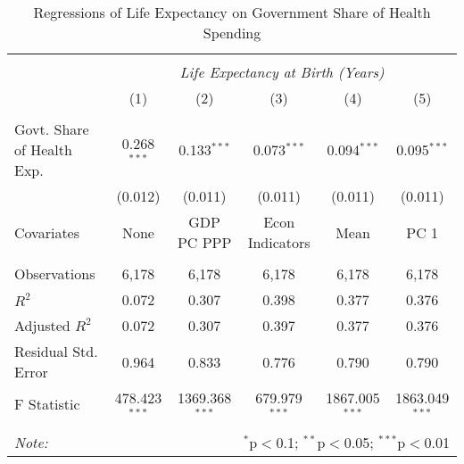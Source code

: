 \begin{table}[!htbp] \centering
  \caption{Regressions of Life Expectancy on Government Share of Health Spending \label{main_regs}}
\begin{tabular}{@{\extracolsep{5pt}}lccccc}
\\[-1.8ex]\hline
\hline \\[-1.8ex]
& \multicolumn{5}{c}{\textit{Life Expectancy at Birth (Years)}} \
\cr \
\\[-1.8ex] & (1) & (2) & (3) & (4) & (5) \\
\hline \\[-1.8ex]
 Govt. Share of Health Exp. & 0.268$^{***}$ & 0.133$^{***}$ & 0.073$^{***}$ & 0.094$^{***}$ & 0.095$^{***}$ \\
  & (0.012) & (0.011) & (0.011) & (0.011) & (0.011) \\
 Covariates & None & GDP PC PPP & Econ Indicators & Mean & PC 1 \\
\hline \\[-1.8ex]
 Observations & 6,178 & 6,178 & 6,178 & 6,178 & 6,178 \\
 $R^2$ & 0.072 & 0.307 & 0.398 & 0.377 & 0.376 \\
 Adjusted $R^2$ & 0.072 & 0.307 & 0.397 & 0.377 & 0.376 \\
 Residual Std. Error & 0.964 & 0.833 & 0.776 & 0.790 & 0.790  \\
 F Statistic & 478.423$^{***}$  & 1369.368$^{***}$  & 679.979$^{***}$  & 1867.005$^{***}$  & 1863.049$^{***}$  \\
\hline
\hline \\[-1.8ex]
\textit{Note:} & \multicolumn{5}{r}{$^{*}$p$<$0.1; $^{**}$p$<$0.05; $^{***}$p$<$0.01} \\
\end{tabular}
\end{table}